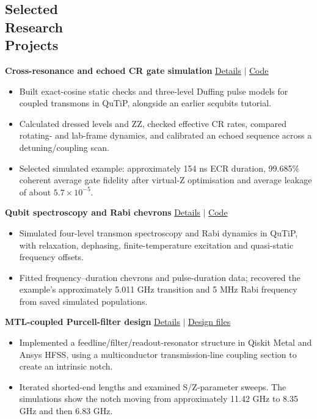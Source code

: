 \documentclass[margin,line]{resume}
\newcommand{\projectlink}[2]{\href{https://mukul-quantum-researcher.github.io/projects/#1/}{#2}}
\newcommand{\cvheading}[1]{\section{\mysidestyle #1}}
\begin{document}
\begin{resume}
\cvheading{Selected\\Research\\Projects}
\begin{minipage}{\linewidth}
\textbf{Cross-resonance and echoed CR gate simulation} \hfill \projectlink{cr-ecr}{Details} $\vert$ \href{https://github.com/Mukul-Quantum-Researcher/Superconducting-qubits-hardware}{Code}
\begin{itemize}
\item Built exact-cosine static checks and three-level Duffing pulse models for coupled transmons in QuTiP, alongside an earlier scqubits tutorial.
\item Calculated dressed levels and ZZ, checked effective CR rates, compared rotating- and lab-frame dynamics, and calibrated an echoed sequence across a detuning/coupling scan.
\item Selected simulated example: approximately 154 ns ECR duration, 99.685\% coherent average gate fidelity after virtual-Z optimisation and average leakage of about $5.7\times10^{-5}$.
\end{itemize}
\end{minipage}\par\vspace{3pt}

\begin{minipage}{\linewidth}
\textbf{Qubit spectroscopy and Rabi chevrons} \hfill \projectlink{qubit-spectroscopy}{Details} $\vert$ \href{https://github.com/Mukul-Quantum-Researcher/Superconducting-qubits-hardware/blob/main/notebooks/qubit_spectroscopy.ipynb}{Code}
\begin{itemize}
\item Simulated four-level transmon spectroscopy and Rabi dynamics in QuTiP, with relaxation, dephasing, finite-temperature excitation and quasi-static frequency offsets.
\item Fitted frequency--duration chevrons and pulse-duration data; recovered the example's approximately 5.011 GHz transition and 5 MHz Rabi frequency from saved simulated populations.
\end{itemize}
\end{minipage}\par\vspace{3pt}

\begin{minipage}{\linewidth}
\textbf{MTL-coupled Purcell-filter design} \hfill \projectlink{purcell-filter}{Details} $\vert$ \href{https://github.com/Mukul-Quantum-Researcher/purcell-filter-design}{Design files}
\begin{itemize}
\item Implemented a feedline/filter/readout-resonator structure in Qiskit Metal and Ansys HFSS, using a multiconductor transmission-line coupling section to create an intrinsic notch.
\item Iterated shorted-end lengths and examined S/Z-parameter sweeps. The simulations show the notch moving from approximately 11.42 GHz to 8.35 GHz and then 6.83 GHz.
\end{itemize}
\end{minipage}\par\vspace{3pt}


\end{resume}
\end{document}
